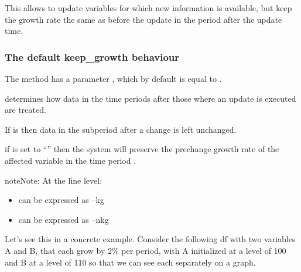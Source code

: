 \documentclass[letterpaper,10pt,english]{jupyterBook}
\begin{document}
\sphinxAtStartPar
This allows to update variables for which new information is available, but keep the growth rate the same as before the update in the period after the update time.


\subsubsection{The default keep\_growth behaviour}
\label{\detokenize{content/04_PythonEssentials/UpdateCommand:the-default-keep-growth-behaviour}}
\sphinxAtStartPar
The  method has a parameter , which by default is equal to .

\sphinxAtStartPar
{} determines how data in  the time periods after those where an update is executed are treated.

\sphinxAtStartPar
If  is  then data in the sub\sphinxhyphen{}period after a change is left unchanged.

\sphinxAtStartPar
if  is set to “” then the system will preserve the pre\sphinxhyphen{}change growth rate of the affected variable in the time period .

\begin{sphinxadmonition}{note}{Note:}
\sphinxAtStartPar
At the line level:
\begin{itemize}
\item {} 
\sphinxAtStartPar
{} can be expressed as –kg

\item {} 
\sphinxAtStartPar
{} can be expressed as –nkg

\end{itemize}
\end{sphinxadmonition}

\sphinxAtStartPar
Let’s see this in a concrete example.  Consider the following  df with two variables A and B, that each grow by 2\% per period, with A initialized at a level of 100 and B at a level of 110 so that we can see each separately on a graph.
\end{document}
